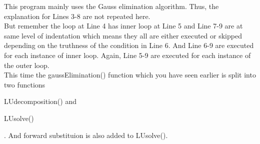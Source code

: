 \begin{commentary}
	This program mainly uses the Gauss elimination algorithm.
	Thus, the explanation for Lines 3-8 are not repeated here.\\

	But remember the loop at Line 4 has inner loop at Line 5 and Line 7-9 are at same level of indentation which means they all are either executed or skipped depending on the truthness of the condition in Line 6.
	And Line 6-9 are executed for each instance of inner loop.
	Again, Line 5-9 are executed for each instance of the outer loop.\\

This time the gaussElimination() function which you have seen earlier is split into two functions \begin{enumerate*} \item LUdecomposition() and \item LUsolve() \end{enumerate*}.
			And forward substituion is also added to LUsolve().


\end{commentary}
